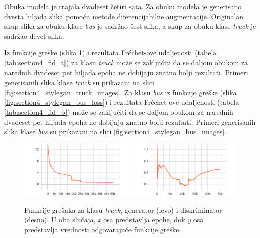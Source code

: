 \documentclass[12pt,oneside]{memoir}
\begin{document}
Obuka modela je trajala dvadeset četiri sata. Za obuku modela je generisano dvesta hiljada slika pomoću metode diferencijabilne augmentacije. Originalan skup slika za obuku klase \textit{bus} je sadržao šest slika, a skup za obuku klase \textit{truck} je sadržao devet slika.

Iz funkcije greške (slika \ref{fig:section4_stylegan_truck_loss}) i rezultata Fréchet-ove udaljenosti (tabela \ref{tab:section4_fid_t}) za klasu \textit{truck} može se zaključiti da se daljom obukom za narednih dvadeset pet hiljada epoha ne dobijaju znatno bolji rezultati. Primeri generisanih slika klase \textit{truck} su prikazani na slici \ref{fig:section4_stylegan_truck_images}.
Za klasu \textit{bus} iz funkcije greške (slika \ref{fig:section4_stylegan_bus_loss}) i rezultata Fréchet-ove udaljenosti (tabela \ref{tab:section4_fid_b}) može se zaključiti da se daljom obukom za narednih dvadeset pet hiljada epoha ne dobijaju znatno bolji rezultati. Primeri generisanih slika klase \textit{bus} su prikazani na slici \ref{fig:section4_stylegan_bus_images}.


\begin{figure}[!htbp]
\centering
  \includegraphics[width=0.49\textwidth]{matfmaster/stylegan/truck/g_loss.png}
  \includegraphics[width=0.49\textwidth]{matfmaster/stylegan/truck/d_loss.png}
\caption{Funkcije grešaka za klasu \textit{truck}, generator (levo) i diskriminator (desno). U oba slučaja, \textit{x} osa predstavlja epohe, dok \textit{y} osa predstavlja vrednosti odgovarajuće funkcije greške.}\label{fig:section4_stylegan_truck_loss}
\end{figure}
\end{document}
